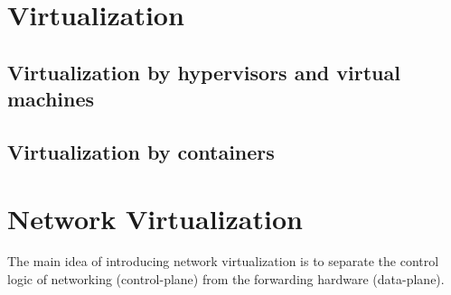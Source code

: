 





% 
%
%
%
\section{Virtualization}





\subsection{Virtualization by hypervisors and virtual machines}


\subsection{Virtualization by containers}



\section{Network Virtualization}
%
%
%
%
%
The main idea of introducing network virtualization is to separate the 
control logic of networking (control-plane) from the forwarding hardware (data-plane).

